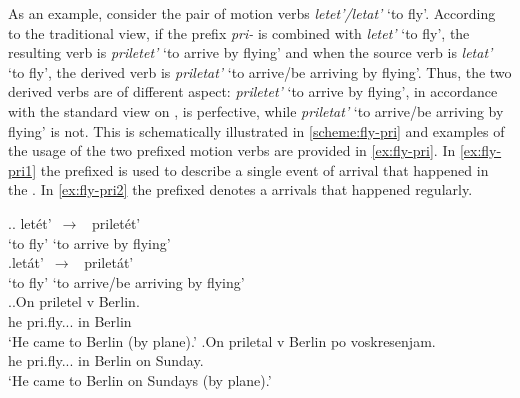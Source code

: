 
As an example, consider the pair of motion verbs \textit{letet'/letat'} `to fly'. According to the traditional view, if the prefix \textit{pri-} is combined with \textit{letet'}\textsubscript{\DET} `to fly', the resulting verb is \textit{priletet'}\textsuperscript{\PF} `to arrive by flying' and when the source verb is \textit{letat'}\textsubscript{\INDET} `to fly', the derived verb is \textit{priletat'}\textsuperscript{\IPF} `to arrive/be arriving by flying'. Thus, the two derived verbs are of different aspect: \textit{priletet'} `to arrive by flying', in accordance with the standard view on , is perfective, while \textit{priletat'} `to arrive/be arriving by flying' is not. This is schematically illustrated in \ref{scheme:fly-pri} and examples of the usage of the two prefixed motion verbs are provided in \ref{ex:fly-pri}. In \ref{ex:fly-pri1} the prefixed  is used to describe a single event of arrival that happened in the . In \ref{ex:fly-pri2} the prefixed  denotes a  arrivals that happened regularly.

\ex.\label{scheme:fly-pri}\ag. let\'{e}t'\textsuperscript{\IPF}~$\to$~ prilet\'{e}t'\textsuperscript{\PF}\\
{`to fly'} {`to arrive by flying'}\\
\bg.let\'{a}t'\textsuperscript{\IPF}~$\to$~ prilet\'{a}t'\textsuperscript{\IPF}\\
{`to fly'} {`to arrive/be arriving by flying'}\\

\ex.\label{ex:fly-pri}\ag.\label{ex:fly-pri1}On priletel\textsuperscript{\PF} v Berlin.\\
he pri.fly... in Berlin\\
\trans `He came to Berlin (by plane).'
\bg.\label{ex:fly-pri2}On priletal\textsuperscript{\IPF} v Berlin po voskresenjam.\\
he pri.fly... in Berlin on Sunday.\\
\trans `He came to Berlin on Sundays (by plane).'

